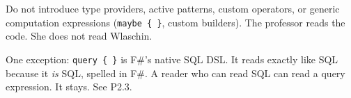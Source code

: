\documentclass[11pt]{article}
\begin{document}
Do not introduce type providers, active patterns, custom
operators, or generic computation expressions (\texttt{maybe
\{ \}}, custom builders).  The professor reads the code.  She
does not read Wlaschin.

One exception: \texttt{query \{ \}} is F\#'s native SQL DSL.
It reads exactly like SQL because it \emph{is} SQL, spelled in
F\#.  A reader who can read SQL can read a query expression.
It stays.  See P2.3.
\end{document}
